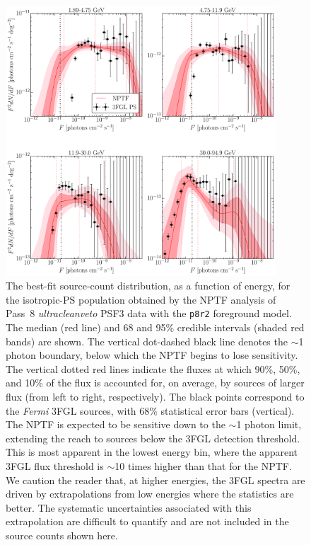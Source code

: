 \begin{figure}[!htbp] %
   \centering
   \includegraphics[width=0.9\textwidth]{ch-igrb/plots/Rp8RBlw1-1-SourceCounts-final-700-E15-p8-3br.pdf} 
   \caption{The best-fit source-count distribution, as a function of energy, for the isotropic-PS population obtained by the NPTF analysis of Pass~8 {\it ultracleanveto} PSF3 data with the \texttt{p8r2} foreground model.  The median (red line) and 68 and 95\% credible intervals (shaded red bands) are shown.  The vertical dot-dashed black line denotes the $\sim$1 photon boundary, below which the NPTF begins to lose sensitivity.  The vertical dotted red lines indicate the fluxes at which 90\%, 50\%, and 10\% of the flux is accounted for, on average, by sources of larger flux (from left to right, respectively). The black points correspond to the \emph{Fermi} 3FGL sources, with 68\% statistical error bars (vertical).  The NPTF is expected to be sensitive down to the $\sim$1 photon limit, extending the reach to sources below the 3FGL detection threshold.  This is most apparent in the lowest energy bin, where the apparent 3FGL flux threshold is  $\sim$10 times higher than that for the NPTF.   
 We caution the reader that, at higher energies, the 3FGL spectra are driven by extrapolations from low energies where the statistics are better.  The systematic uncertainties associated with this extrapolation are difficult to quantify and are not included in the source counts shown here.}
   \label{fig:dndsdata}
\end{figure}


